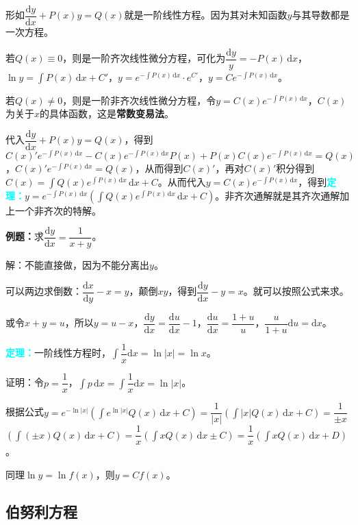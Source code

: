 \documentclass[UTF8, 12pt]{ctexart}
\begin{document}
        形如$\dfrac{\textrm{d}y}{\textrm{d}x}+P(x)y=Q(x)$就是一阶线性方程。因为其对未知函数$y$与其导数都是一次方程。

        若$Q(x)\equiv 0$，则是一阶齐次线性微分方程，可化为$\dfrac{\textrm{d}y}{y}=-P(x)\,\textrm{d}x$，$\ln y=\int P(x)\,\textrm{d}x+C'$，$y=e^{-\int P(x)\,\textrm{d}x}\cdot e^{C'}$，$y=Ce^{-\int P(x)\,\textrm{d}x}$。

        若$Q(x)\neq 0$，则是一阶非齐次线性微分方程，令$y=C(x)e^{-\int P(x)\,\textrm{d}x}$，$C(x)$为关于$x$的具体函数，这是\textbf{常数变易法}。

        代入$\dfrac{\textrm{d}y}{\textrm{d}x}+P(x)y=Q(x)$，得到$C(x)'e^{-\int P(x)\,\textrm{d}x}-C(x)e^{-\int P(x)\,\textrm{d}x}P(x)+P(x)C(x)e^{-\int P(x)\,\textrm{d}x}=Q(x)$，$C(x)'e^{-\int P(x)\,\textrm{d}x}=Q(x)$，从而得到$C(x)'$，再对$C(x)'$积分得到$C(x)=\displaystyle{\int Q(x)e^{\int P(x)\,\textrm{d}x}\,\textrm{d}x}+C$。从而代入$y=C(x)e^{-\int P(x)\,\textrm{d}x}$，得到\textcolor{aqua}{\textbf{定理：}}$y=e^{-\int P(x)\,\textrm{d}x}(\int Q(x)e^{\int P(x)\,\textrm{d}x}\,\textrm{d}x+C)$。非齐次通解就是其齐次通解加上一个非齐次的特解。

        \textbf{例题：}求$\dfrac{\textrm{d}y}{\textrm{d}x}=\dfrac{1}{x+y}$。

        解：不能直接做，因为不能分离出$y$。

        可以两边求倒数：$\dfrac{\textrm{d}x}{\textrm{d}y}-x=y$，颠倒$xy$，得到$\dfrac{\textrm{d}y}{\textrm{d}x}-y=x$。就可以按照公式来求。

        或令$x+y=u$，所以$y=u-x$，$\dfrac{\textrm{d}y}{\textrm{d}x}=\dfrac{\textrm{d}u}{\textrm{d}x}-1$，$\dfrac{\textrm{d}u}{\textrm{d}x}=\dfrac{1+u}{u}$，$\dfrac{u}{1+u}\textrm{d}u=\textrm{d}x$。

        \textcolor{aqua}{\textbf{定理：}}一阶线性方程时，$\displaystyle{\int\dfrac{1}{x}\textrm{d}x}=\ln\vert x\vert=\ln x$。

        证明：令$p=\dfrac{1}{x}$，$\int p\,\textrm{d}x=\displaystyle{\int\dfrac{1}{x}\textrm{d}x}=\ln\vert x\vert$。

        根据公式$y=e^{-\ln\vert x\vert}(\int e^{\ln\vert x\vert}Q(x)\,\textrm{d}x+C)=\dfrac{1}{\vert x\vert}(\int\vert x\vert Q(x)\,\textrm{d}x+C)=\dfrac{1}{\pm x}$\\$(\int(\pm x)Q(x)\,\textrm{d}x+C)=\dfrac{1}{x}(\int xQ(x)\,\textrm{d}x\pm C)=\dfrac{1}{x}(\int xQ(x)\,\textrm{d}x+D)$。

        同理$\ln y=\ln f(x)$，则$y=Cf(x)$。

        \subsection{伯努利方程}
\end{document}
